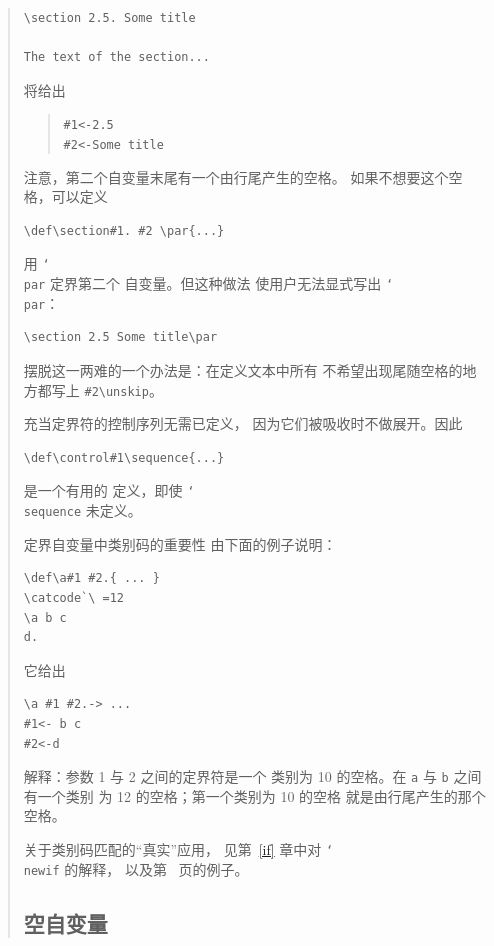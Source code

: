 \documentclass[a4paper]{rapport3}
\def\nl{\protect\\}\def\n#1{{\tt #1}}\def\cs#1{{\tt\char`\\#1}}\let\csc\cs
\newenvironment{disp}{\begin{quotation}}{\end{quotation}}
\begin{document}
\begin{disp}
\begin{verbatim}
\section 2.5. Some title

The text of the section...
\end{verbatim}
将给出
\begin{disp}\verb>#1<-2.5>\nl
\verb>#2<-Some title>\n{}\end{disp}
注意，第二个自变量末尾有一个由行尾产生的空格。
如果不想要这个空格，可以定义 \begin{verbatim}
\def\section#1. #2 \par{...}
\end{verbatim}
用 \n{}\cs{par} 定界第二个
自变量。但这种做法
使用户无法显式写出 \cs{par}：
\begin{verbatim}
\section 2.5 Some title\par
\end{verbatim}
摆脱这一两难的一个办法是：在定义文本中所有
不希望出现尾随空格的地方都写上
\verb>#2\unskip>。

充当定界符的控制序列无需已定义，
因为它们被吸收时不做展开。因此
\begin{verbatim}
\def\control#1\sequence{...}
\end{verbatim}
是一个有用的
定义，即使 \cs{sequence} 未定义。

定界自变量中类别码的重要性
由下面的例子说明：
\begin{verbatim}
\def\a#1 #2.{ ... }
\catcode`\ =12
\a b c
d.
\end{verbatim}
它给出
\begin{verbatim}
\a #1 #2.-> ...
#1<- b c
#2<-d
\end{verbatim}
解释：参数 1 与 2 之间的定界符是一个
类别为 10 的空格。在 \n{a} 与 \n{b} 之间有一个类别
为 12 的空格；第一个类别为 10 的空格
就是由行尾产生的那个空格。

关于类别码匹配的“真实”应用，
见第~\ref{if} 章中对 \cs{newif} 的解释，
以及第~\pageref{ex:jobnumber} 页的例子。


\subsection{空自变量}


\end{disp}
\end{document}
